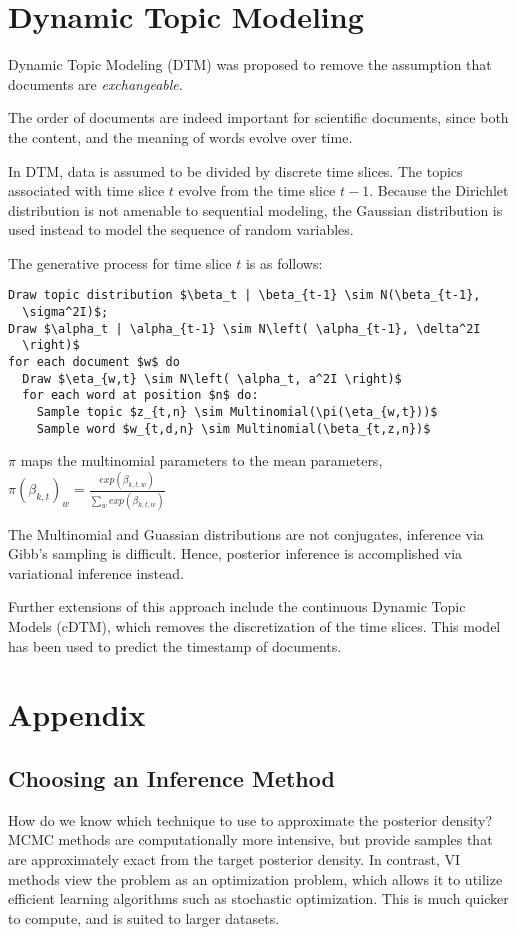 \documentclass[letterpaper]{article}
\begin{document}
\section{Dynamic Topic Modeling}
\label{sec:dtm}
Dynamic Topic Modeling (DTM) was proposed to remove the assumption
that documents are \textit{exchangeable}. \citep{blei2006dynamic}

The order of documents are indeed important for scientific documents,
since both the content, and the meaning of words evolve over time.

In DTM, data is assumed to be divided by discrete time slices. The
topics associated with time slice $t$ evolve from the time slice
$t-1$. Because the Dirichlet distribution is not amenable to
sequential modeling, the Gaussian distribution is used instead to
model the sequence of random variables.

The generative process for time slice $t$ is as follows:

\begin{lstlisting}[mathescape=true]
Draw topic distribution $\beta_t | \beta_{t-1} \sim N(\beta_{t-1},
  \sigma^2I)$;
Draw $\alpha_t | \alpha_{t-1} \sim N\left( \alpha_{t-1}, \delta^2I
  \right)$
for each document $w$ do
  Draw $\eta_{w,t} \sim N\left( \alpha_t, a^2I \right)$
  for each word at position $n$ do:
    Sample topic $z_{t,n} \sim Multinomial(\pi(\eta_{w,t}))$
    Sample word $w_{t,d,n} \sim Multinomial(\beta_{t,z,n})$
\end{lstlisting}

$\pi$ maps the multinomial parameters to the mean parameters,
$\pi\left( \beta_{k,t} \right)_w = \frac{exp(\beta_{k,t,w})}{\sum_w exp\left( \beta_{k,t,w} \right)}$

The Multinomial and Guassian distributions are not conjugates,
inference via Gibb's sampling is difficult. Hence, posterior inference
is accomplished via variational inference instead.

Further extensions of this approach include the continuous Dynamic
Topic Models (cDTM), which removes the discretization of the time
slices. \citep{wang-2012-contin-time} This model has been used to
predict the timestamp of documents.

\section{Appendix}
\subsection{Choosing an Inference Method}
\label{sub:choosing-inference}
How do we know which technique to use to approximate the posterior
density? MCMC methods are computationally more intensive, but provide
samples that are approximately exact from the target posterior
density. In contrast, VI methods view the problem as an optimization
problem, which allows it to utilize efficient learning algorithms such
as stochastic optimization. This is much quicker to compute, and is
suited to larger datasets.
\end{document}
